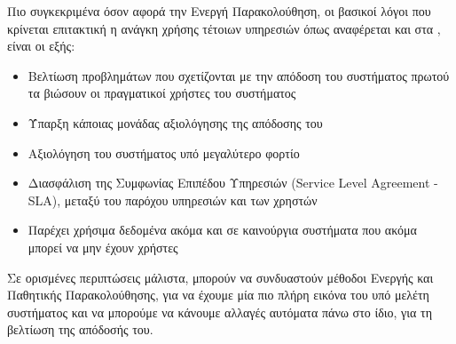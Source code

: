 Πιο συγκεκριμένα όσον αφορά την Ενεργή Παρακολούθηση, οι βασικοί λόγοι που κρίνεται επιτακτική η ανάγκη χρήσης τέτοιων υπηρεσιών όπως αναφέρεται και στα \cite{web_server_monitoring}, \cite{synthetic_monitoring_using_http_archive}
είναι οι εξής:

\begin{itemize}
	\item Βελτίωση προβλημάτων που σχετίζονται με την απόδοση του συστήματος
		πρωτού τα βιώσουν οι πραγματικοί χρήστες του συστήματος
	\item Ύπαρξη κάποιας μονάδας αξιολόγησης της απόδοσης του
	\item Αξιολόγηση του συστήματος υπό μεγαλύτερο φορτίο
	\item Διασφάλιση της Συμφωνίας Επιπέδου Υπηρεσιών (Service Level Agreement - SLA), μεταξύ
		του παρόχου υπηρεσιών και των χρηστών
	\item Παρέχει χρήσιμα δεδομένα ακόμα και σε καινούργια συστήματα που ακόμα μπορεί να μην έχουν χρήστες   
\end{itemize}

Σε ορισμένες περιπτώσεις μάλιστα, μπορούν να συνδυαστούν μέθοδοι Ενεργής και Παθητικής Παρακολούθησης, για να έχουμε μία πιο πλήρη εικόνα του υπό μελέτη συστήματος και να μπορούμε να κάνουμε αλλαγές αυτόματα πάνω στο ίδιο, για τη βελτίωση της απόδοσής του.


